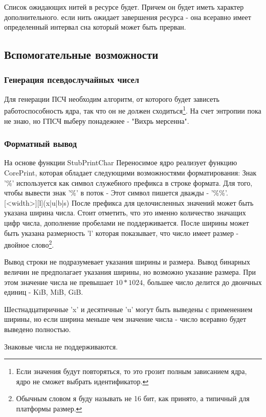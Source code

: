 Список ожидающих нитей в ресурсе будет. Причем он будет иметь характер
дополнительного. если нить ожидает завершения ресурса - она всеравно имеет
определенный интервал сна который может быть прерван.

\subsection{Вспомогательные возможности}

\subsubsection{Генерация псевдослучайных чисел}

Для генерации ПСЧ необходим алгоритм, от которого будет зависеть
работоспособность ядра, так что он не должен сходиться\footnote{Если значения
будут повторяться, то это грозит полным зависанием ядра, ядро не сможет выбрать идентификатор.}. На счет энтропии пока не знаю, но ГПСЧ выберу понадежнее -
"Вихрь мерсенна".

\subsubsection{Форматный вывод}

На основе функции StubPrintChar Переносимое ядро реализует функцию CorePrint,
которая обладает следующими возможностями форматирования: Знак '\%' используется
как символ служебного префикса в строке формата. Для того, чтобы вывести знак
'\%' в поток - Этот символ пишется дважды - '\%\%'. [<width>][l](x|u|b|s) После
префикса для целочисленных значений может быть указана ширина числа. Стоит
отметить, что это именно количество значащих цифр числа, дополнение пробелами
не поддерживается. После ширины может быть указана размерность 'l' которая
показывает, что число имеет размер - двойное слово\footnote{Обычным словом я
буду называть не 16 бит, как принято, а типичный для платформы размер.}.

Вывод строки не подразумевает указания ширины и размера. Вывод бинарных величин
не предполагает указания ширины, но возможно указание размера. При этом значение
числа не превышает $10 * 1024$, большее число делится до двоичных единиц - KiB,
MiB, GiB.

Шестнадцатиричные 'x' и десятичные 'u' могут быть выведены с применением ширины,
но если ширина меньше чем значение числа - число всеравно будет выведено
полностью.

Знаковые числа не поддерживаются.
